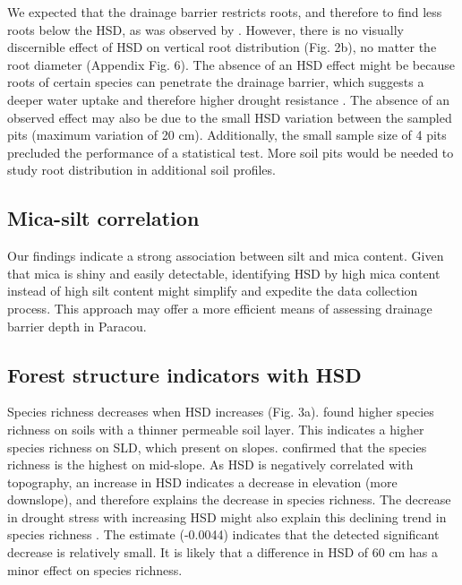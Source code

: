 \documentclass[fleqn,11pt]{latex/stylish_article} %
\begin{document}
We expected that the drainage barrier restricts roots, and therefore to find less roots below the HSD, as was observed by \citet{humbelCaracterisationParMesures1978}. However, there is no visually discernible effect of HSD on vertical root distribution (Fig. 2b), no matter the root diameter (Appendix Fig. 6). The absence of an HSD effect might be because roots of certain species can penetrate the drainage barrier, which suggests a deeper water uptake and therefore higher drought resistance \citep{ferryGeneseFonctionnementHydrique2003}. The absence of an observed effect may also be due to the small HSD variation between the sampled pits (maximum variation of 20 cm). Additionally, the small sample size of 4 pits precluded the performance of a statistical test. More soil pits would be needed to study root distribution in additional soil profiles.

\hypertarget{mica-silt-correlation}{%
\subsection{Mica-silt correlation}\label{mica-silt-correlation}}

Our findings indicate a strong association between silt and mica content. Given that mica is shiny and easily detectable, identifying HSD by high mica content instead of high silt content might simplify and expedite the data collection process. This approach may offer a more efficient means of assessing drainage barrier depth in Paracou.

\hypertarget{forest-structure-indicators-with-hsd}{%
\subsection{Forest structure indicators with HSD}\label{forest-structure-indicators-with-hsd}}

Species richness decreases when HSD increases (Fig. 3a). \citet{sabatierInfluenceSoilCover1997} found higher species richness on soils with a thinner permeable soil layer. This indicates a higher species richness on SLD, which present on slopes. \citet{alliePervasiveLocalScaleTreeSoil2015} confirmed that the species richness is the highest on mid-slope. As HSD is negatively correlated with topography, an increase in HSD indicates a decrease in elevation (more downslope), and therefore explains the decrease in species richness. The decrease in drought stress with increasing HSD might also explain this declining trend in species richness \citep{sabatierInfluenceSoilCover1997}. The estimate (-0.0044) indicates that the detected significant decrease is relatively small. It is likely that a difference in HSD of 60 cm has a minor effect on species richness.
\end{document}
